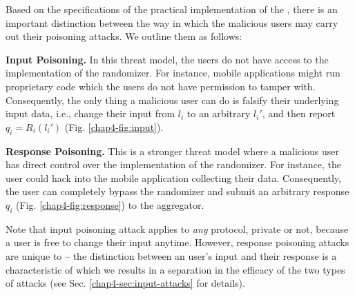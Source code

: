 Based on the specifications of the practical implementation of the \ldp, there is an important distinction between the way in which the malicious users may carry out their poisoning attacks. We outline them as follows:

\squishlist
    \item \textbf{Input Poisoning.} In this threat model, the users do not have access to the implementation of the \ldp{} randomizer. For instance, mobile applications might run proprietary code which the users do not have permission to tamper with. Consequently, the only thing a malicious user can do is falsify their underlying input data, i.e.,  change their input from $l_i$ to an arbitrary $l_i'$, and then report $q_i = R_i(l_i')$ (Fig. \ref{chap4-fig:input}).
    
    \item \textbf{Response Poisoning.} This is a stronger threat model where a malicious user has direct control over the implementation of the \ldp{} randomizer. For instance, the user could hack into the mobile application collecting their data. Consequently, the user can completely bypass the randomizer and submit an arbitrary response $q_{i}$ (Fig. \ref{chap4-fig:response}) to the aggregator.
\squishend

Note that input poisoning attack applies to \textit{any} protocol, private or not, because a user is free to change their input anytime. However, response poisoning attacks are unique to \ldp{} -- the distinction between an user's input and their response is a characteristic of \ldp{} which we results in a separation in the efficacy of the two types of attacks (see Sec. \ref{chap4-sec:input-attacks} for details). 


